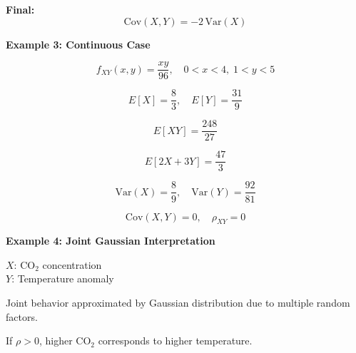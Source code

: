 \documentclass[12pt]{article}
\begin{document}
\textbf{Final:}
\[
\mathrm{Cov}(X,Y) = -2 \, \mathrm{Var}(X)
\]

\vspace{10pt}

\textbf{Example 3: Continuous Case}

\[
f_{XY}(x,y) = \frac{xy}{96}, \quad 0<x<4,\; 1<y<5
\]

\[
E[X] = \frac{8}{3}, \quad E[Y] = \frac{31}{9}
\]

\[
E[XY] = \frac{248}{27}
\]

\[
E[2X+3Y] = \frac{47}{3}
\]

\[
\mathrm{Var}(X) = \frac{8}{9}, \quad \mathrm{Var}(Y) = \frac{92}{81}
\]

\[
\mathrm{Cov}(X,Y) = 0, \quad \rho_{XY} = 0
\]

\vspace{10pt}

\textbf{Example 4: Joint Gaussian Interpretation}

$X$: CO$_2$ concentration \\
$Y$: Temperature anomaly

Joint behavior approximated by Gaussian distribution due to multiple random factors.

If $\rho > 0$, higher CO$_2$ corresponds to higher temperature.
\end{document}
